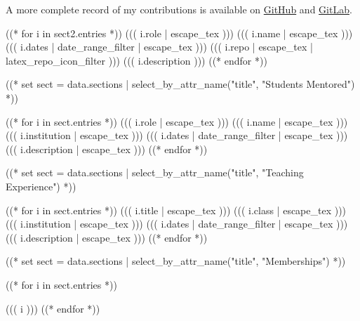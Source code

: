 \documentclass[10pt, letterpaper]{awesome-cv}
\begin{document}
A more complete record of my contributions is available on
\href{https://github.com/((( data.preamble.contact.github )))}
     {GitHub} and \href{https://gitlab.com/((( data.preamble.contact.gitlab )))}{GitLab}.
\begin{cventries}
((* for i in sect2.entries *))
\cventry
  {((( i.role | escape_tex )))}
  {((( i.name | escape_tex )))}
  {((( i.dates | date_range_filter | escape_tex )))}
  {((( i.repo | escape_tex | latex_repo_icon_filter )))}
  {((( i.description )))}
((* endfor *))
\end{cventries}

((* set sect = data.sections | select_by_attr_name("title", "Students Mentored") *))
\begin{cventries}
((* for i in sect.entries *))
\cventry
  {((( i.role | escape_tex )))}
  {((( i.name | escape_tex )))}
  {((( i.institution | escape_tex )))}
  {((( i.dates | date_range_filter | escape_tex )))}
  {((( i.description | escape_tex )))}
((* endfor *))
\end{cventries}
((* set sect = data.sections | select_by_attr_name("title", "Teaching Experience") *))
\begin{cventries}
((* for i in sect.entries *))
\cventry
  {((( i.title | escape_tex )))}
  {((( i.class | escape_tex )))}
  {((( i.institution | escape_tex )))}
  {((( i.dates | date_range_filter | escape_tex )))}
  {((( i.description | escape_tex )))}
((* endfor *))
\end{cventries}

((* set sect = data.sections | select_by_attr_name("title", "Memberships") *))
\begin{cventries}
\begin{cvitems}
  ((* for i in sect.entries *))
  \item{((( i )))}
  ((* endfor *))
\end{cvitems}
\vspace{1em}
\end{cventries}

\end{document}
